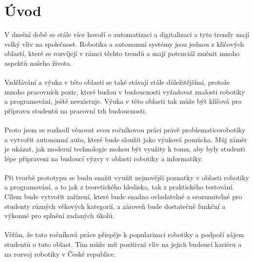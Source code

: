 \documentclass[12pt, a4paper]{article}
\begin{document}
	\newpage
	\tableofcontents
	
	\newpage
	\section*{Úvod}
	\paragraph{} V dnešní době se stále více hovoří o automatizaci a digitalizaci a tyto trendy mají velký vliv na společnost. Robotika a autonomní systémy jsou jednou z klíčových oblastí, které se rozvíjejí v rámci těchto trendů a mají potenciál změnit mnoho aspektů našeho života.
	\paragraph{} Vzdělávání a výuka v této oblasti se také stávají stále důležitějšími, protože mnoho pracovních pozic, které budou v budoucnosti vyžadovat znalosti robotiky a programování, ještě neexistuje. Výuka v této oblasti tak může být klíčová pro přípravu studentů na pracovní trh budoucnosti.
	\paragraph{} Proto jsem se rozhodl věnovat svou ročníkovou práci právě problematicerobotiky a vytvořit autonomní auto, které bude sloužit jako výuková pomůcka. Můj záměr je ukázat, jak moderní technologie mohou být využity k tomu, aby byly studenti lépe připraveni na budoucí výzvy v oblasti robotiky a informatiky.
	\paragraph{} Při tvorbě prototypu se budu snažit využít nejnovější poznatky v oblasti robotiky a programování, a to jak z teoretického hlediska, tak z praktického testování. Cílem bude vytvořit zařízení, které bude snadno ovladatelné a srozumitelné pro studenty různých věkových kategorií, a zároveň bude dostatečně funkční a výkonné pro splnění zadaných úkolů.
	\paragraph{} Věřím, že tato ročníková práce přispěje k popularizaci robotiky a podpoří zájem studentů o tuto oblast. Tím může mít pozitivní vliv na jejich budoucí kariéru a na rozvoj robotiky v České republice.
	
\end{document}
